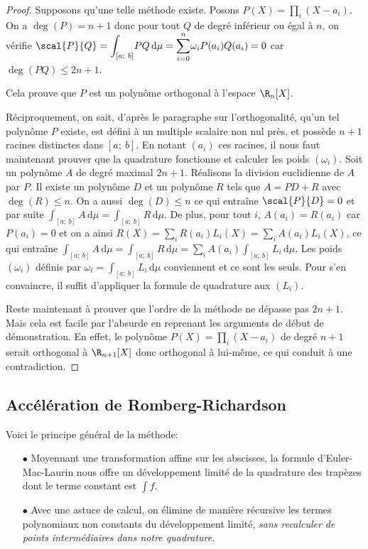 \begin{proof}
Supposons qu'une telle méthode existe. Posons $P(X) = \displaystyle{\prod \limits_{i}} (X-a_i)$. On a $\deg(P) = n+1$ donc pour tout $Q$ de degré inférieur ou égal à $n$, on vérifie $\scal{P}{Q} = \displaystyle{\int_{[a;~b]}} PQ \, \mathrm d \mu = \displaystyle{\sum_{i=0}^n} \omega_i P(a_i)Q(a_i) = 0$ car $\deg(PQ) \leq 2n+1$.

Cela prouve que $P$ est un polynôme orthogonal à l'espace $\R_n[X]$. 

\medskip
Réciproquement, on sait, d'après le paragraphe sur l'orthogonalité, qu'un tel polynôme $P$ existe, est défini à un multiple scalaire non nul près, et possède $n+1$ racines distinctes dans $[a;~b]$. En notant $(a_i)$ ces racines, il nous faut maintenant prouver que la quadrature fonctionne et calculer les poids $(\omega_i)$. Soit un polynôme $A$ de degré maximal $2n+1$. Réalisons la division euclidienne de $A$ par $P$. Il existe un polynôme $D$ et un polynôme $R$ tels que $A = PD + R$ avec $\deg(R) \leq n$. On a aussi $\deg(D) \leq n$ ce qui entraîne $\scal{P}{D} = 0$ et par suite $\displaystyle{\int_{[a;~b]}} A \, \mathrm d \mu = \displaystyle{\int_{[a;~b]}} R \, \mathrm d \mu$. De plus, pour tout $i$, $A(a_i) = R(a_i)$ car $P(a_i) = 0$ et on a ainsi $R(X) = \displaystyle{\sum \limits_{i}} R(a_i) L_i(X) = \displaystyle{\sum \limits_{i}} A(a_i) L_i(X)$, ce qui entraîne $\displaystyle{\int_{[a;~b]}} A \, \mathrm d \mu = \displaystyle{\int_{[a;~b]}} R \, \mathrm d \mu = \displaystyle{\sum \limits_{i}} A(a_i) \displaystyle{\int_{[a;~b]}} L_i \, \mathrm d \mu$. Les poids $(\omega_i)$ définis par $\omega_i = \displaystyle{\int_{[a;~b]}} L_i \, \mathrm d \mu$ conviennent et ce sont les seuls. Pour s'en convaincre, il suffit d'appliquer la formule de quadrature aux $(L_i)$.

\medskip
Reste maintenant à prouver que l'ordre de la méthode ne dépasse pas $2n+1$. Mais cela est facile par l'absurde en reprenant les arguments de début de démonstration. En effet, le polynôme $P(X) = \displaystyle{\prod \limits_{i}} (X-a_i)$ de degré $n+1$ serait orthogonal à $\R_{n+1}[X]$ donc orthogonal à lui-même, ce qui conduit à une contradiction.
\end{proof}


\subsection{Accélération de Romberg-Richardson}

Voici le principe général de la méthode:
\begin{itemize}
\item[$\bullet$] 
Moyennant une transformation affine sur les abscisses, la formule d'Euler-Mac-Laurin nous offre un développement limité de la quadrature des trapèzes dont le terme constant est $\int f$.
\item[$\bullet$] 
Avec une astuce de calcul, on élimine de manière récursive les termes polynomiaux non constants du développement limité, \emph{sans recalculer de points intermédiaires dans notre quadrature.}
\end{itemize}


